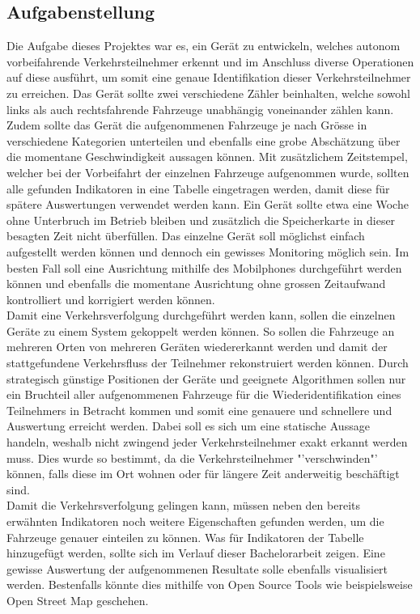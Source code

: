 \subsection{Aufgabenstellung}
Die Aufgabe dieses Projektes war es, ein Gerät zu entwickeln, welches autonom vorbeifahrende Verkehrsteilnehmer erkennt und im Anschluss diverse Operationen auf diese ausführt, um somit eine genaue Identifikation dieser Verkehrsteilnehmer zu erreichen. Das Gerät sollte zwei verschiedene Zähler beinhalten, welche sowohl links als auch rechtsfahrende Fahrzeuge unabhängig voneinander zählen kann. Zudem sollte das Gerät die aufgenommenen Fahrzeuge je nach Grösse in verschiedene Kategorien unterteilen und ebenfalls eine grobe Abschätzung über die momentane Geschwindigkeit aussagen können.  Mit zusätzlichem Zeitstempel, welcher bei der Vorbeifahrt der einzelnen Fahrzeuge aufgenommen wurde, sollten alle gefunden Indikatoren in eine Tabelle eingetragen werden, damit diese für spätere Auswertungen verwendet werden kann.  Ein Gerät sollte etwa eine Woche ohne Unterbruch im Betrieb bleiben und zusätzlich die Speicherkarte in dieser besagten Zeit nicht überfüllen. Das einzelne Gerät soll möglichst einfach aufgestellt werden können und dennoch ein gewisses Monitoring möglich sein. Im besten Fall soll eine Ausrichtung mithilfe des Mobilphones durchgeführt werden können und ebenfalls die momentane Ausrichtung ohne grossen Zeitaufwand kontrolliert und korrigiert werden können.\\
Damit eine Verkehrsverfolgung durchgeführt werden kann, sollen die einzelnen Geräte zu einem System gekoppelt werden können. So sollen die Fahrzeuge an mehreren Orten von mehreren Geräten wiedererkannt werden und damit der stattgefundene Verkehrsfluss der Teilnehmer rekonstruiert werden können. Durch strategisch günstige Positionen der Geräte und geeignete Algorithmen sollen nur ein Bruchteil aller aufgenommenen Fahrzeuge für die Wiederidentifikation eines Teilnehmers in Betracht kommen und somit eine genauere und schnellere und Auswertung erreicht werden. Dabei soll es sich um eine statische Aussage handeln, weshalb nicht zwingend jeder Verkehrsteilnehmer exakt erkannt werden muss. Dies wurde so bestimmt, da die Verkehrsteilnehmer "'verschwinden"' können, falls diese im Ort wohnen oder für längere Zeit anderweitig beschäftigt sind.\\
Damit die Verkehrsverfolgung gelingen kann, müssen neben den bereits erwähnten Indikatoren noch weitere Eigenschaften gefunden werden, um die Fahrzeuge genauer einteilen zu können. Was für Indikatoren der Tabelle hinzugefügt werden, sollte sich im Verlauf dieser Bachelorarbeit zeigen. Eine gewisse Auswertung der aufgenommenen Resultate solle ebenfalls visualisiert werden. Bestenfalls könnte dies mithilfe von Open Source Tools wie beispielsweise Open Street Map geschehen.